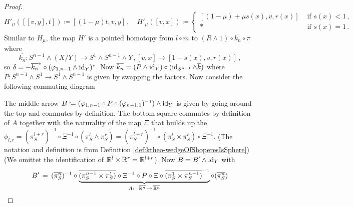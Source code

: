 \begin{proof}
	\begin{equation*}
		H'_\mu([[v,y],t])\coloneq[(1-\mu)t,v,y]\,,\quad 
		H'_\mu([v,x])\coloneq \begin{cases*}
			[(1-\mu)+\mu s (x),v,r(x)]& \text{ if }s(x)<1 \,,\\
			*&\text{ if }s(x)=1\,.
		\end{cases*}
	\end{equation*}
	Similar to $H_\mu$, the map $H'$ is a pointed homotopy from $l\circ \overline{m}$ to $(R\wedge 1)\circ \overline{k_n}\circ \pi$ where 
	\begin{equation*}
		\overline{k_n}:S^{n-1}\wedge (X/Y)\to S^1\wedge S^{n-1}\wedge Y\,,
		[v,x]\mapsto [1-s(x),v,r(x)]\,,
	\end{equation*} so $\delta=-\overline{k_n}^*\circ (\varphi_{1,n-1}\wedge \operatorname{\mathrm{id}}_Y)^*$. Now $\overline{k_n}=(P\wedge \operatorname{\mathrm{id}}_Y)\circ (\operatorname{\mathrm{id}}_{S^{n-1}}\wedge \overline{k})$
	 where $P:S^{n-1}\wedge S^1\to S^1 \wedge S^{n-1}$ is given by swapping the factors.
	 Now consider the following commuting diagram
	\begin{center}
	\end{center} The middle arrow $B\coloneq (\varphi_{1,n-1}\circ P\circ (\varphi_{n-1,1})^{-1})\wedge \operatorname{\mathrm{id}}_Y$ is given by going around the top and commutes by definition. 
	The bottom square commutes by definition of $A$ together with the naturality of the map $\Xi$ that builds up the $\phi_{l,r}=(\overline{\pi_S^{l+r}})^{-1}\circ \Xi^{-1}\circ (\overline{\pi_S^l}\wedge \overline{\pi_S^r})=(\overline{\pi_S^{l+r}})^{-1}\circ\overline{ (\pi_S^l\times \pi_S^r)}\circ \Xi^{-1}$. (The notation and definition is from Definition \ref{def:ktheo-wedgeOfShoperesIsSphere}) (We omittet the identification of $\mathbb{R}^l\times \mathbb{R}^r=\mathbb{R}^{l+r}$). Now $B=B'\wedge \operatorname{\mathrm{id}}_Y$ with 
	\begin{equation*}
		B'\,=\,(\overline{\pi_S^{n}})^{-1}\circ\underbrace{\overline{ (\pi_S^{n-1}\times \pi_S^1)}\circ \Xi^{-1}\circ P \circ \Xi\circ \overline{ (\pi_S^1\times \pi_S^{n-1})}^{-1}}_{A:~~\overline{\R^n}\,\to \, \overline{\R^n}}\circ   (\overline{\pi_S^n})

\end{equation*}
\end{proof}
